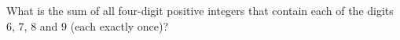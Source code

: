 What is the sum of all four-digit positive integers that contain each of the digits $6$, $7$, $8$ and $9$ (each exactly once)?
